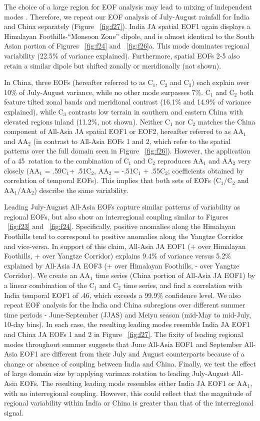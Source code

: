 	The choice of a large region for EOF analysis may lead to mixing of independent modes \citep{Dai1997,Wilks2006}. Therefore, we repeat our EOF analysis of July-August rainfall for India and China separately (Figure ~\ref{fig:f27}). India JA spatial EOF1 again displays a Himalayan Foothills-``Monsoon Zone'' dipole, and is almost identical to the South Asian portion of Figures ~\ref{fig:f24} and ~\ref{fig:f26}a. This mode dominates regional variability (22.5\% of variance explained). Furthermore, spatial EOFs 2-5 also retain a similar dipole but shifted zonally or meridionally (not shown). 
	
	In China, three EOFs (hereafter referred to as C$_1$, C$_2$ and C$_3$) each explain over 10\% of July-August variance, while no other mode surpasses 7\%. C$_1$ and C$_2$ both feature tilted zonal bands and meridional contrast (16.1\% and 14.9\% of variance explained), while C$_3$ contrasts low terrain in southern and eastern China with elevated regions inland (11.2\%, not shown). Neither C$_1$ nor C$_2$ matches the China component of All-Asia JA spatial EOF1 or EOF2, hereafter referred to as AA$_1$ and AA$_2$ (in contrast to All-Asia EOFs 1 and 2, which refer to the spatial patterns over the full domain seen in Figure ~\ref{fig:f26}). However, the application of a 45\textdegree\ rotation to the combination of  C$_1$ and C$_2$ reproduces AA$_1$ and AA$_2$ very closely (AA$_1$ = .59C$_1$+ .51C$_2$, AA$_2$ = -.51C$_1$ + .55C$_2$; coefficients obtained by correlation of temporal EOFs). This implies that both sets of EOFs (C$_1$/C$_2$ and AA$_1$/AA$_2$) describe the same variability.  
	
	Leading July-August All-Asia EOFs capture similar patterns of variability as regional EOFs, but also show an interregional coupling similar to Figures ~\ref{fig:f23} and ~\ref{fig:f24}.  Specifically, positive anomalies along the Himalayan Foothills tend to correspond to positive anomalies along the Yangtze Corridor and vice-versa. In support of this claim, All-Asia JA EOF1 (+ over Himalayan Foothills, + over Yangtze Corridor) explains 9.4\% of variance versus 5.2\% explained by All-Asia JA EOF3 (+ over Himalayan Foothills, - over Yangtze Corridor). We create an AA$_1$ time series (China portion of All-Asia JA EOF1) by a linear combination of the C$_1$ and C$_2$ time series, and find a correlation with India temporal EOF1 of .46, which exceeds a 99.9\% confidence level. We also repeat EOF analysis for the India and China subregions over different summer time periods - June-September (JJAS) and Meiyu season (mid-May to mid-July, 10-day bins). In each case, the resulting leading modes resemble India JA EOF1 and China JA EOFs 1 and 2 in Figure ~\ref{fig:f27}. The fixity of leading regional modes throughout summer suggests that June All-Asia EOF1 and September All-Asia EOF1 are different from their July and August counterparts because of a change or absence of coupling between India and China. Finally, we test the effect of large domain size by applying varimax rotation to leading July-August All-Asia EOFs. The resulting leading mode resembles either India JA EOF1 or AA$_1$, with no interregional coupling. However, this could reflect that the magnitude of regional variability within India or China is greater than that of the interregional signal.
	

